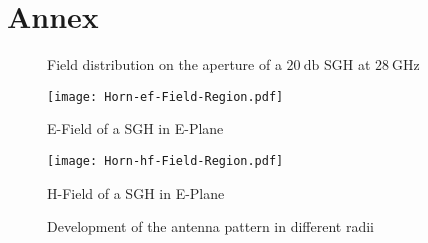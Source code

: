 \chapter{Annex}

\begin{figure}
\centering
  \centering
  \centering
\caption{Field distribution on the aperture of a $\SI{20}{\decibel}$ \ac{SGH} at $\SI{28}{\giga\hertz}$}
\label{fig:fielddist}
\end{figure}

\begin{figure}
\centering
\texttt{[image: Horn-ef-Field-Region.pdf]}
\caption{E-Field of a \ac{SGH} in E-Plane}
\label{fig:eplaneef}
\end{figure}
\begin{figure}
\centering
\texttt{[image: Horn-hf-Field-Region.pdf]}
\caption{H-Field of a \ac{SGH} in E-Plane}
\label{fig:eplaneef}
\end{figure}

\begin{figure}
\centering
  \centering
  \centering
  \centering
\caption{Development of the antenna pattern in different radii}
\label{fig:devantennap}
\end{figure}